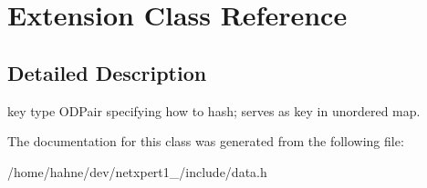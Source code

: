 \hypertarget{classExtension}{}\section{Extension Class Reference}
\label{classExtension}


\subsection{Detailed Description}
key type O\+D\+Pair specifying how to hash; serves as key in unordered map. 

The documentation for this class was generated from the following file\+:\begin{DoxyCompactItemize}
\item 
/home/hahne/dev/netxpert1\+\_/include/data.\+h\end{DoxyCompactItemize}
